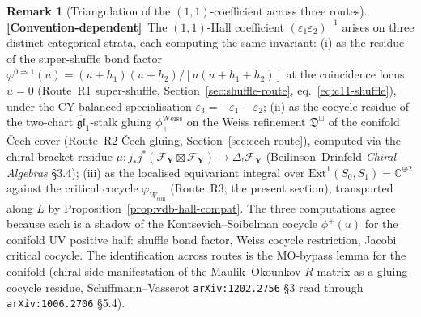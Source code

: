 \documentclass[11pt]{amsart}
\theoremstyle{definition}
\newtheorem{remark}[theorem]{Remark}
\providecommand{\bY}{\mathbf{Y}}
\providecommand{\cF}{\mathcal{F}}
\providecommand{\Ext}{\mathrm{Ext}}
\providecommand{\bC}{\mathbb{C}}
\providecommand{\fgl}{\mathfrak{gl}}
\providecommand{\fD}{\mathfrak{D}}
\providecommand{\ClaimStatusConventionDependent}{\textbf{\textsf{[Convention-dependent]}}}
\begin{document}
\begin{remark}[Triangulation of the $(1,1)$-coefficient across three routes]
\label{rem:vdb-triangulation}
\ClaimStatusConventionDependent\
The $(1,1)$-Hall coefficient $(\varepsilon_1 \varepsilon_2)^{-1}$ arises
on three distinct categorical strata, each computing the same invariant:
(i) as the residue of the super-shuffle bond factor
$\varphi^{0 \Rightarrow 1}(u) = (u+h_1)(u+h_2)/[u(u+h_1+h_2)]$ at the
coincidence locus $u = 0$ (Route~R1 super-shuffle,
Section~\ref{sec:shuffle-route}, eq.~\eqref{eq:c11-shuffle}), under
the CY-balanced specialisation $\varepsilon_3 = -\varepsilon_1 -
\varepsilon_2$; (ii) as the cocycle
residue of the two-chart $\widehat{\fgl}_1$-stalk gluing
$\phi_{+-}^{\mathrm{Weiss}}$ on the Weiss refinement
$\fD^{\sqcup}$ of the conifold \v{C}ech cover (Route~R2 \v{C}ech gluing,
Section~\ref{sec:cech-route}), computed via the chiral-bracket residue
$\mu : j_* j^* (\cF_\bY \boxtimes \cF_\bY) \to \Delta_! \cF_\bY$
(Beilinson--Drinfeld \emph{Chiral Algebras} \S3.4); (iii) as the
localised equivariant integral over $\Ext^1(S_0, S_1) = \bC^{\oplus 2}$
against the critical cocycle $\varphi_{W_{\mathrm{con}}}$ (Route~R3, the
present section), transported along $L$ by
Proposition~\ref{prop:vdb-hall-compat}. The three computations agree
because each is a shadow of the Kontsevich--Soibelman cocycle
$\phi^+(u)$ for the conifold UV positive half: shuffle bond factor,
Weiss cocycle restriction, Jacobi critical cocycle. The identification
across routes is the MO-bypass lemma for the conifold (chiral-side
manifestation of the Maulik--Okounkov $R$-matrix as a gluing-cocycle
residue, Schiffmann--Vasserot \texttt{arXiv:1202.2756} \S3 read through
\texttt{arXiv:1006.2706} \S5.4).
\end{remark}
\end{document}
